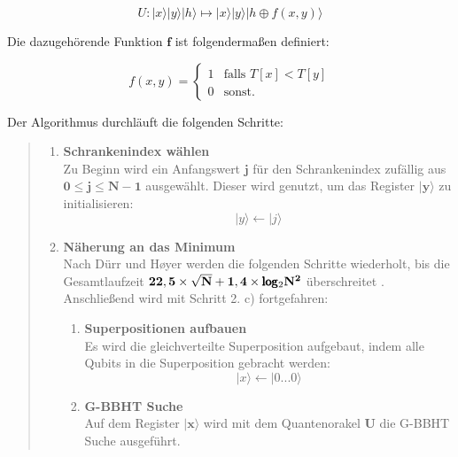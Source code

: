 \begin{equation}
    U: |x\rangle|y\rangle|h\rangle \mapsto |x\rangle|y\rangle|h \oplus f(x,y)\rangle
\end{equation}

Die dazugehörende Funktion $\mathbf{f}$ ist folgendermaßen definiert:

\begin{equation}
    f(x,y) = \begin{cases}
        1 & \text{falls } T[x] < T[y]\\    
        0 & \text{sonst.}   
      \end{cases}
\end{equation}

Der Algorithmus durchläuft die folgenden Schritte:
 
\begin{quote}
    \begin{enumerate}
        \item \textbf{Schrankenindex wählen}
        \\
        Zu Beginn wird ein Anfangswert $\mathbf{j}$ für den Schrankenindex zufällig aus $\mathbf{0 \leq j \leq N-1}$ ausgewählt. Dieser wird genutzt, um das Register $\mathbf{|y\rangle}$ zu initialisieren: 
        \begin{equation}
            |y\rangle \leftarrow |j\rangle
        \end{equation}
        \item \textbf{Näherung an das Minimum}
        \\
        Nach Dürr und Høyer werden die folgenden Schritte wiederholt, bis die Gesamtlaufzeit $\mathbf{22,5 \times \sqrt{N} + 1,4 \times \pmb\log\textsubscript{2}N^2}$ überschreitet \cite[S. 141]{Ho96}. 
        Anschließend wird mit Schritt 2. c) fortgefahren:
        \\
        \begin{enumerate}
            \item \textbf{Superpositionen aufbauen}
            \\
            Es wird die gleichverteilte Superposition aufgebaut, indem alle Qubits in die Superposition gebracht werden:
            \begin{equation}
                |x\rangle \leftarrow |0 ... 0 \rangle
            \end{equation}
            \item \textbf{G-BBHT Suche}
            \\
            Auf dem Register $\mathbf{|x\rangle}$ wird mit dem Quantenorakel $\mathbf{U}$ die G-BBHT Suche ausgeführt. 

\end{enumerate}
\end{enumerate}
\end{quote}

